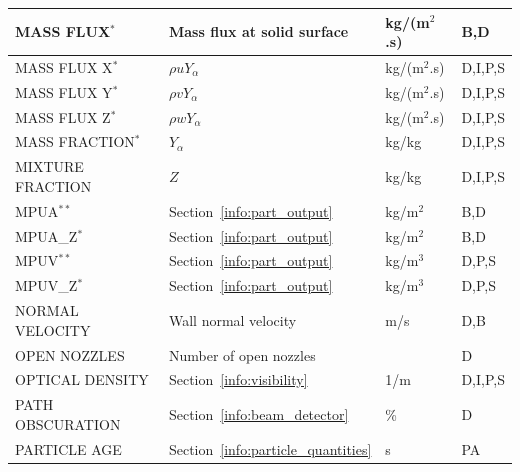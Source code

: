 \documentclass[11pt]{book}
\begin{document}
\begin{longtable}{@{\extracolsep{\fill}}|l|l|l|l|}
{\ct MASS FLUX}$^*$                             & Mass flux at solid surface                    & \si{kg/(m$^2$.s)} & B,D       \\ \hline
{\ct MASS FLUX X}$^*$                           & $\rho u Y_\alpha$                             & \si{kg/(m$^2$.s)} & D,I,P,S   \\ \hline
{\ct MASS FLUX Y}$^*$                           & $\rho v Y_\alpha$                             & \si{kg/(m$^2$.s)} & D,I,P,S   \\ \hline
{\ct MASS FLUX Z}$^*$                           & $\rho w Y_\alpha$                             & \si{kg/(m$^2$.s)} & D,I,P,S   \\ \hline
{\ct MASS FRACTION}$^*$                         & $Y_\alpha$                                    & kg/kg          & D,I,P,S      \\ \hline
{\ct MIXTURE FRACTION}                          & $Z$                                           & kg/kg          & D,I,P,S      \\ \hline
{\ct MPUA}$^{**}$                               & Section~\ref{info:part_output}                & kg/m$^2$       & B,D          \\ \hline
{\ct MPUA\_Z}$^{*}$                             & Section~\ref{info:part_output}                & kg/m$^2$       & B,D          \\ \hline
{\ct MPUV}$^{**}$                               & Section~\ref{info:part_output}                & kg/m$^3$       & D,P,S        \\ \hline
{\ct MPUV\_Z}$^{*}$                             & Section~\ref{info:part_output}                & kg/m$^3$       & D,P,S        \\ \hline
{\ct NORMAL VELOCITY}                           & Wall normal velocity                          & m/s            & D,B          \\ \hline
{\ct OPEN NOZZLES}                              & Number of open nozzles                        &                & D            \\ \hline
{\ct OPTICAL DENSITY}                           & Section~\ref{info:visibility}                 & 1/m            & D,I,P,S      \\ \hline
{\ct PATH OBSCURATION}                          & Section~\ref{info:beam_detector}              & \%             & D            \\ \hline
{\ct PARTICLE AGE}                              & Section~\ref{info:particle_quantities}        & s              & PA           \\ \hline

\end{longtable}
\end{document}
